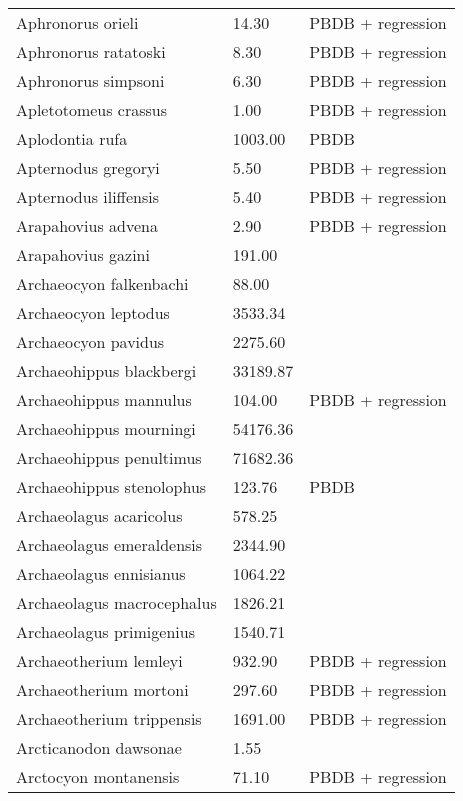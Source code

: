 \begin{longtable}{p{} p{} p{}}
    Aphronorus orieli & 14.30 & PBDB + regression \\ 
    Aphronorus ratatoski & 8.30 & PBDB + regression \\ 
    Aphronorus simpsoni & 6.30 & PBDB + regression \\ 
    Apletotomeus crassus & 1.00 & PBDB + regression \\ 
    Aplodontia rufa & 1003.00 & PBDB \\ 
    Apternodus gregoryi & 5.50 & PBDB + regression \\ 
    Apternodus iliffensis & 5.40 & PBDB + regression \\ 
    Arapahovius advena & 2.90 & PBDB + regression \\ 
    Arapahovius gazini & 191.00 & \cite{Controy1987} \\ 
    Archaeocyon falkenbachi & 88.00 & \cite{Stirton1932} \\ 
    Archaeocyon leptodus & 3533.34 & \cite{Tomiya2013} \\ 
    Archaeocyon pavidus & 2275.60 & \cite{Tomiya2013} \\ 
    Archaeohippus blackbergi & 33189.87 & \cite{Tomiya2013} \\ 
    Archaeohippus mannulus & 104.00 & PBDB + regression \\ 
    Archaeohippus mourningi & 54176.36 & \cite{Tomiya2013} \\ 
    Archaeohippus penultimus & 71682.36 & \cite{Tomiya2013} \\ 
    Archaeohippus stenolophus & 123.76 & PBDB \\ 
    Archaeolagus acaricolus & 578.25 & \cite{Tomiya2013} \\ 
    Archaeolagus emeraldensis & 2344.90 & \cite{Tomiya2013} \\ 
    Archaeolagus ennisianus & 1064.22 & \cite{Tomiya2013} \\ 
    Archaeolagus macrocephalus & 1826.21 & \cite{Tomiya2013} \\ 
    Archaeolagus primigenius & 1540.71 & \cite{Tomiya2013} \\ 
    Archaeotherium lemleyi & 932.90 & PBDB + regression \\ 
    Archaeotherium mortoni & 297.60 & PBDB + regression \\ 
    Archaeotherium trippensis & 1691.00 & PBDB + regression \\ 
    Arcticanodon dawsonae & 1.55 & \cite{White1988} \\ 
    Arctocyon montanensis & 71.10 & PBDB + regression \\ 

\end{longtable}
